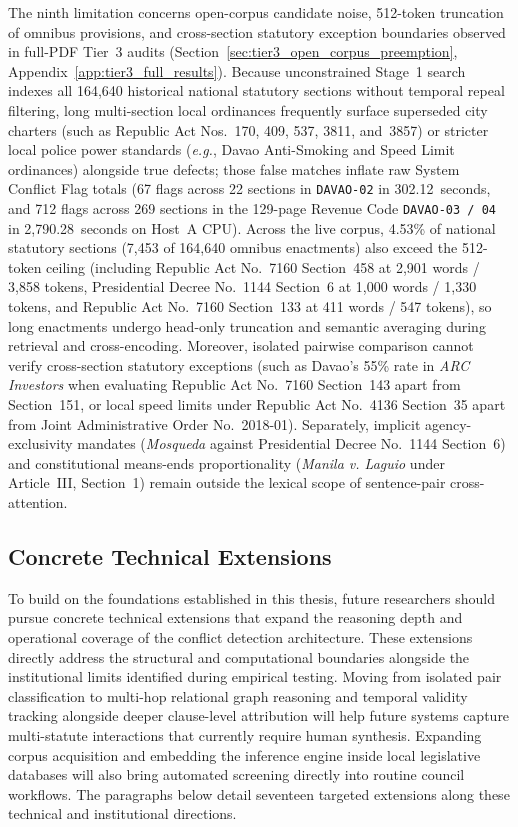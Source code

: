 The ninth limitation concerns open-corpus candidate noise, 512-token truncation of omnibus provisions, and cross-section statutory exception boundaries observed in full-PDF Tier~3 audits (Section~\ref{sec:tier3_open_corpus_preemption}, Appendix~\ref{app:tier3_full_results}). Because unconstrained Stage~1 search indexes all 164,640 historical national statutory sections without temporal repeal filtering, long multi-section local ordinances frequently surface superseded city charters (such as Republic Act Nos.~170, 409, 537, 3811, and~3857) or stricter local police power standards (\textit{e.g.}, Davao Anti-Smoking and Speed Limit ordinances) alongside true defects; those false matches inflate raw System Conflict Flag totals (67 flags across 22 sections in \texttt{DAVAO-02} in 302.12~seconds, and 712 flags across 269 sections in the 129-page Revenue Code \texttt{DAVAO-03 / 04} in 2,790.28~seconds on Host~A CPU). Across the live corpus, 4.53\% of national statutory sections (7,453 of 164,640 omnibus enactments) also exceed the 512-token ceiling (including Republic Act No.~7160 Section~458 at 2,901 words / 3,858 tokens, Presidential Decree No.~1144 Section~6 at 1,000 words / 1,330 tokens, and Republic Act No.~7160 Section~133 at 411 words / 547 tokens), so long enactments undergo head-only truncation and semantic averaging during retrieval and cross-encoding. Moreover, isolated pairwise comparison cannot verify cross-section statutory exceptions (such as Davao's 55\% rate in \textit{ARC Investors} when evaluating Republic Act No.~7160 Section~143 apart from Section~151, or local speed limits under Republic Act No.~4136 Section~35 apart from Joint Administrative Order No.~2018-01). Separately, implicit agency-exclusivity mandates (\textit{Mosqueda} against Presidential Decree No.~1144 Section~6) and constitutional means-ends proportionality (\textit{Manila v. Laguio} under Article~III, Section~1) remain outside the lexical scope of sentence-pair cross-attention.


\subsection{Concrete Technical Extensions}
\label{sec:technical_extensions}

To build on the foundations established in this thesis, future researchers should pursue concrete technical extensions that expand the reasoning depth and operational coverage of the conflict detection architecture. These extensions directly address the structural and computational boundaries alongside the institutional limits identified during empirical testing. Moving from isolated pair classification to multi-hop relational graph reasoning and temporal validity tracking alongside deeper clause-level attribution will help future systems capture multi-statute interactions that currently require human synthesis. Expanding corpus acquisition and embedding the inference engine inside local legislative databases will also bring automated screening directly into routine council workflows. The paragraphs below detail seventeen targeted extensions along these technical and institutional directions.

